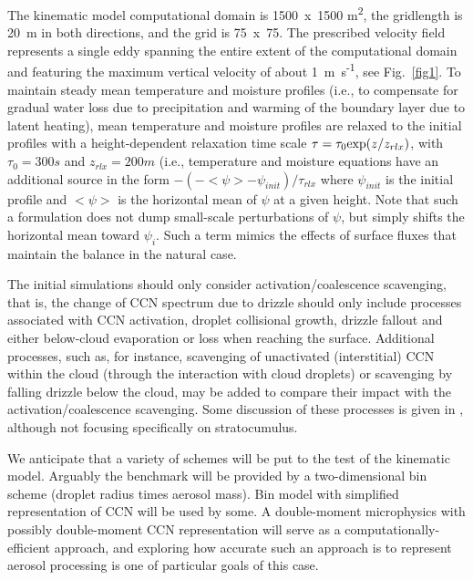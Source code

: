 \documentclass{article}
\begin{document}
  The kinematic model computational domain is 1500~x~1500 m\textsuperscript{2}, the gridlength 
    is 20~m in both directions, and the grid is 75~x~75. 
  The prescribed velocity field represents a single eddy spanning the entire extent of the 
    computational domain and featuring the maximum vertical velocity of about 1~m~s\textsuperscript{-1}, 
    see Fig.~\ref{fig1}. 
  To maintain steady mean temperature and moisture profiles (i.e., to compensate for gradual water loss 
    due to precipitation and warming of the boundary layer due to latent heating), 
    mean temperature and moisture profiles are relaxed to the initial profiles with a height-dependent 
    relaxation time scale $\tau = \tau_{0}{\rm exp}(z/z_{rlx})$, with $\tau_{0} = 300 s$ and $z_{rlx} = 200 m$
    (i.e., temperature and moisture equations have an additional source in the form $-(-<\psi> - \psi_{init})/\tau_{rlx}$
    where $\psi_{init}$ is the initial profile and $<\psi>$ is the horizontal mean of $\psi$ at a given height. 
  Note that such a formulation does not dump small-scale perturbations of $\psi$, but simply shifts the 
    horizontal mean toward $\psi_i$. 
  Such a term mimics the effects of surface fluxes that maintain the balance in the natural case.

  The initial simulations should only consider activation/coalescence scavenging, 
    that is, the change of CCN spectrum due to drizzle should only include processes 
    associated with CCN activation, droplet collisional growth, drizzle fallout and either 
    below-cloud evaporation or loss when reaching the surface. 
  Additional processes, such as, for instance, scavenging of unactivated (interstitial) 
    CCN within the cloud (through the interaction with cloud droplets) or scavenging by 
    falling drizzle below the cloud, may be added to compare their impact with the 
    activation/coalescence scavenging. 
  Some discussion of these processes is given in \citet{Flossmann_and_Wobrock_2010}, 
    although not focusing specifically on stratocumulus.

  We anticipate that a variety of schemes will be put to the test of the kinematic model. 
  Arguably the benchmark will be provided by a two-dimensional bin scheme 
    (droplet radius times aerosol mass). 
  Bin model with simplified representation of CCN will be used by some. 
  A double-moment microphysics with possibly double-moment CCN representation will serve as a 
    computationally-efficient approach, and exploring how accurate such an approach is to represent 
    aerosol processing is one of particular goals of this case.
\end{document}
